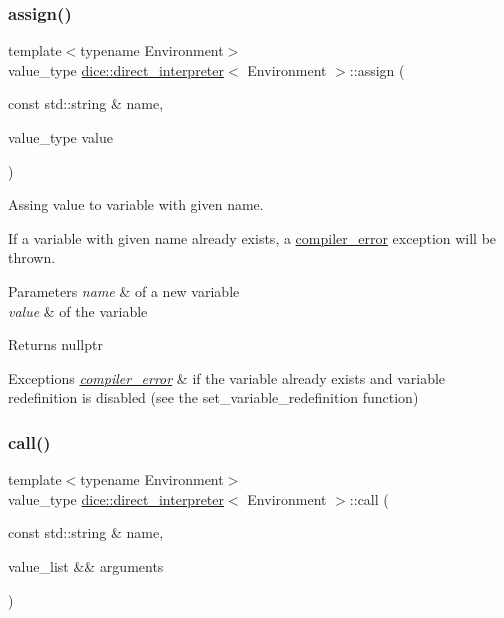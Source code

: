 \subsubsection{\texorpdfstring{assign()}{assign()}}
{\footnotesize\ttfamily template$<$typename Environment$>$ \\
value\+\_\+type \mbox{\hyperlink{classdice_1_1direct__interpreter}{dice\+::direct\+\_\+interpreter}}$<$ Environment $>$\+::assign (\begin{DoxyParamCaption}\item[{const std\+::string \&}]{name,  }\item[{value\+\_\+type}]{value }\end{DoxyParamCaption})\hspace{0.3cm}{\ttfamily [inline]}}



Assing value to variable with given name. 

If a variable with given name already exists, a \mbox{\hyperlink{classdice_1_1compiler__error}{compiler\+\_\+error}} exception will be thrown.


\begin{DoxyParams}{Parameters}
{\em name} & of a new variable \\
\hline
{\em value} & of the variable\\
\hline
\end{DoxyParams}
\begin{DoxyReturn}{Returns}
nullptr
\end{DoxyReturn}

\begin{DoxyExceptions}{Exceptions}
{\em \mbox{\hyperlink{classdice_1_1compiler__error}{compiler\+\_\+error}}} & if the variable already exists and variable redefinition is disabled (see the set\+\_\+variable\+\_\+redefinition function) \\
\hline
\end{DoxyExceptions}
\mbox{\label{classdice_1_1direct__interpreter_afc6a69ed8b3eebb61fc41bccfc7ce725}} 
\subsubsection{\texorpdfstring{call()}{call()}}
{\footnotesize\ttfamily template$<$typename Environment$>$ \\
value\+\_\+type \mbox{\hyperlink{classdice_1_1direct__interpreter}{dice\+::direct\+\_\+interpreter}}$<$ Environment $>$\+::call (\begin{DoxyParamCaption}\item[{const std\+::string \&}]{name,  }\item[{value\+\_\+list \&\&}]{arguments }\end{DoxyParamCaption})\hspace{0.3cm}{\ttfamily [inline]}}



